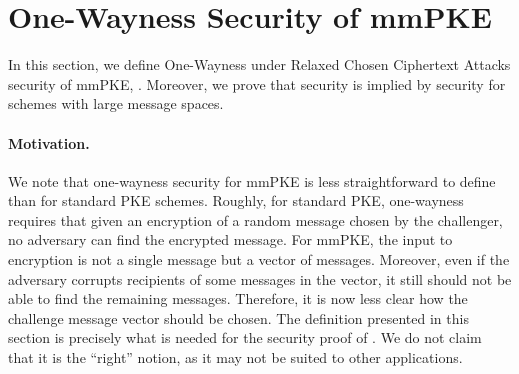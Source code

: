 \section{One-Wayness Security of mmPKE}\label{sec:mmowrcca}

In this section, we define One-Wayness under Relaxed Chosen Ciphertext Attacks security of mmPKE, \mmowrcca. Moreover, we prove that \mmowrcca security is implied by \mmindrcca security for schemes with large message spaces.

\paragraph{Motivation.} We note that one-wayness security for mmPKE is less straightforward to define than for standard PKE schemes. Roughly, for standard PKE, one-wayness requires that given an encryption of a random message chosen by the challenger, no adversary can find the encrypted message. For mmPKE, the input to encryption is not a single message but a vector of messages. Moreover, even if the adversary corrupts recipients of some messages in the vector, it still should not be able to find the remaining messages. Therefore, it is now less clear how the challenge message vector should be chosen.
The definition presented in this section is precisely what is needed for the security proof of \protITK. We do not claim that it is the ``right'' notion, as it may not be suited to other applications.

